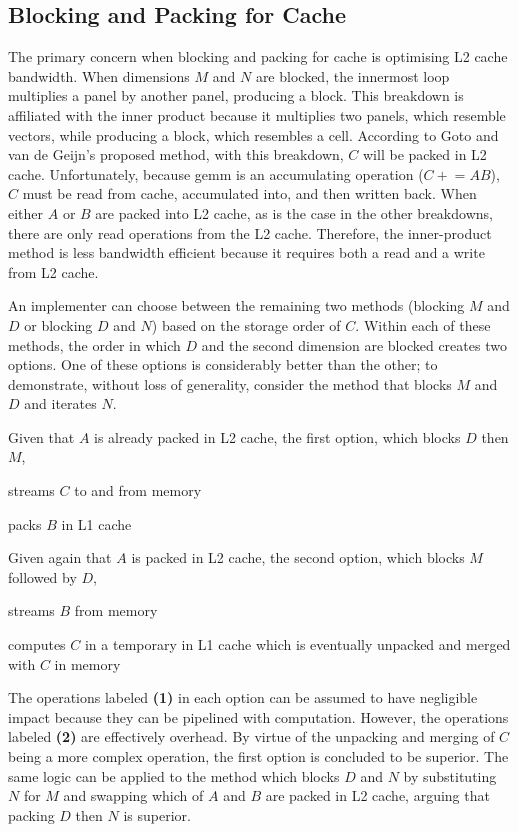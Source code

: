 \documentclass[\main/thesis.tex]{subfiles}
\begin{document}
\subsection{Blocking and Packing for Cache}
\label{sec:blockPack}
The primary concern when blocking and packing for cache is optimising L2 cache bandwidth.
When dimensions $M$ and $N$ are blocked, the innermost loop multiplies a panel by another panel, producing a block.
This breakdown is affiliated with the inner product because it multiplies two panels, which resemble vectors, while producing a block, which resembles a cell.
According to Goto and van de Geijn's proposed method, with this breakdown, $C$ will be packed in L2 cache.
Unfortunately, because \gls{gemm} is an accumulating operation (\eg $C \mathrel{+}= AB$), $C$ must be read from cache, accumulated into, and then written back.
When either $A$ or $B$ are packed into L2 cache, as is the case in the other breakdowns, there are only read operations from the L2 cache.
Therefore, the inner-product method is less bandwidth efficient because it requires both a read and a write from L2 cache.

An implementer can choose between the remaining two methods (blocking $M$ and $D$ or blocking $D$ and $N$) based on the storage order of $C$.
Within each of these methods, the order in which $D$ and the second dimension are blocked creates two options.
One of these options is considerably better than the other; to demonstrate, without loss of generality, consider the method that blocks $M$ and $D$ and iterates $N$.

Given that $A$ is already packed in L2 cache, the first option, which blocks $D$ then $M$,
\begin{enumerate*}[itemjoin*={{ and }}, label=\textbf{(\arabic*)}, after={.}]
  \item streams $C$ to and from memory
  \item packs $B$ in L1 cache
\end{enumerate*}
Given again that $A$ is packed in L2 cache, the second option, which blocks $M$ followed by $D$,
\begin{enumerate*}[itemjoin*={{ and }}, label=\textbf{(\arabic*)}, after={.}]
  \item streams $B$ from memory
  \item computes $C$ in a temporary in L1 cache which is eventually unpacked and merged with $C$ in memory
\end{enumerate*}
The operations labeled \textbf{(1)} in each option can be assumed to have negligible impact because they can be pipelined with computation.
However, the operations labeled \textbf{(2)} are effectively overhead.
By virtue of the unpacking and merging of $C$ being a more complex operation, the first option is concluded to be superior.
The same logic can be applied to the method which blocks $D$ and $N$ by substituting $N$ for $M$ and swapping which of $A$ and $B$ are packed in L2 cache, arguing that packing $D$ then $N$ is superior.
\end{document}
